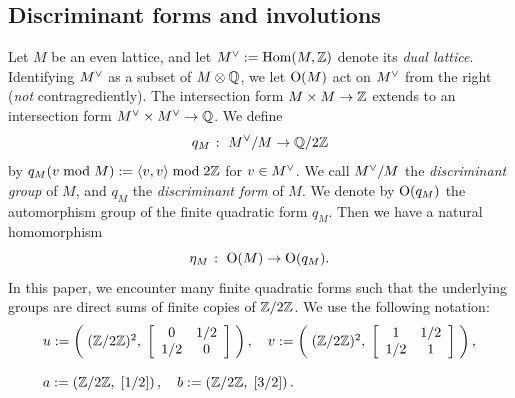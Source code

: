 \documentclass{amsart} %
\begin{document}
\subsection{Discriminant forms and involutions}\label{subsec:discfinvol}
%
\newcommand{\dLat}{M}
\newcommand{\dLatplus}{M_+}
\newcommand{\dLatminus}{M_-}
%
Let $\dLat$ be an even lattice, and 
let $\dLat\dual:=\Hom(\dLat, \ZZ)$ 
 denote its \emph{dual lattice}.
Identifying $\dLat\dual$ as a subset of $\dLat\tensor \QQ$,
we let $\OG(\dLat)$ act on $\dLat\dual$ from the right
(\emph{not} contragrediently).
The intersection form $\dLat \times \dLat \to \ZZ$
extends to 
an intersection form $\dLat\dual \times \dLat\dual \to \QQ$.
We define 
\[
q_\dLat\;\colon\; \dLat\dual/\dLat \to \QQ/2\ZZ
\]
by $q_\dLat(v \bmod \dLat):=\intf{v, v} \bmod 2\ZZ$ for $v\in \dLat\dual$.
We call $\dLat\dual/\dLat$ the \emph{discriminant group} of $\dLat$,
and $q_\dLat$ the \emph{discriminant form} of $\dLat$.
We denote by $\OG(q_\dLat)$ the automorphism group of 
the finite quadratic form $q_\dLat$.
Then we have a natural homomorphism
\[
\eta_\dLat\;\colon\; \OG(\dLat) \to \OG(q_\dLat).
\]
%
In this paper,
we encounter many finite quadratic forms 
such that the underlying groups are 
direct sums of finite copies of $\mathord{\mathbb{Z}}/2\mathord{\mathbb{Z}}$. 
 We use the following notation:
%
\begin{equation}\label{eq:uvab}
\begin{array}{l}
u:=\left(\;(\mathord{\mathbb{Z}}/2\mathord{\mathbb{Z}})^2, \;\left[\begin{array}{cc}0&1/2 \\1/2 &0\end{array}\right]\;\right),\quad 
v:=\left(\;(\mathord{\mathbb{Z}}/2\mathord{\mathbb{Z}})^2, \;\left[\begin{array}{cc}1&1/2 \\1/2 &1\end{array}\right]\;\right),\\
\\
a:=\left(\mathord{\mathbb{Z}}/2\mathord{\mathbb{Z}}, \;\left[1/2\right]\right),\quad
b:=\left(\mathord{\mathbb{Z}}/2\mathord{\mathbb{Z}}, \;\left[3/2\right]\right).
\end{array}
\end{equation}
%
%
%
\end{document}
